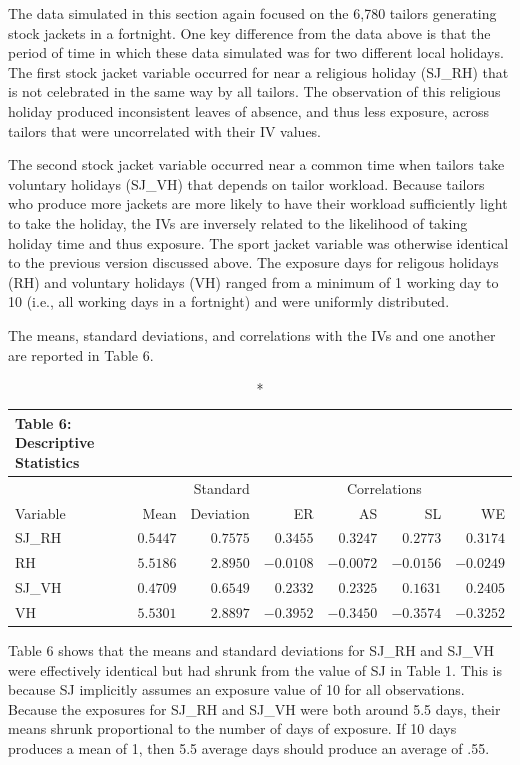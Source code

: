 \documentclass[ShortAfour,times,sageapa]{sagej}
\begin{document}
	The data simulated in this section again focused on the 6,780 tailors generating stock jackets in a fortnight.
	One key difference from the data above is that the period of time in which these data simulated was for two different local holidays.
	The first stock jacket variable occurred for near a religious holiday (SJ\_RH) that is not celebrated in the same way by all tailors.
	The observation of this religious holiday produced inconsistent leaves of absence, and thus less exposure, across tailors that were uncorrelated with their IV values.
	
	The second stock jacket variable occurred near a common time when tailors take voluntary holidays (SJ\_VH) that depends on tailor workload.
	Because tailors who produce more jackets are more likely to have their workload sufficiently light to take the holiday, the IVs are inversely related to the likelihood of taking holiday time and thus exposure.
	The sport jacket variable was otherwise identical to the previous version discussed above. 
	The exposure days for religous holidays (RH) and voluntary holidays (VH) ranged from a minimum of 1 working day to 10 (i.e., all working days in a fortnight) and were uniformly distributed.
	
	The means, standard deviations, and correlations with the IVs and one another are reported in Table 6.
	
	\begin{longtable}{lrrrrrr}
		\caption*{
			{\large Table 6: Descriptive Statistics}
		} \\ 
		\toprule
		&  &  Standard & \multicolumn{4}{c}{Correlations} \\ 
		\cmidrule(lr){4-7}
		Variable & Mean & Deviation & ER & AS & SL & WE \\ 
		\midrule
		SJ\_RH & $0.5447$ & $0.7575$ & $0.3455$ & $0.3247$ & $0.2773$ & $0.3174$ \\ 
		RH & $5.5186$ & $2.8950$ & $-0.0108$ & $-0.0072$ & $-0.0156$ & $-0.0249$ \\ 
		SJ\_VH & $0.4709$ & $0.6549$ & $0.2332$ & $0.2325$ & $0.1631$ & $0.2405$ \\ 
		VH & $5.5301$ & $2.8897$ & $-0.3952$ & $-0.3450$ & $-0.3574$ & $-0.3252$ \\ 
		\bottomrule
	\end{longtable}
	
	Table 6 shows that the means and standard deviations for SJ\_RH and SJ\_VH were effectively identical but had shrunk from the value of SJ in Table 1.
	This is because SJ implicitly assumes an exposure value of 10 for all observations. 
	Because the exposures for SJ\_RH and SJ\_VH were both around 5.5 days, their means shrunk proportional to the number of days of exposure.
	If 10 days produces a mean of 1, then 5.5 average days should produce an average of .55.
	
\end{document}
